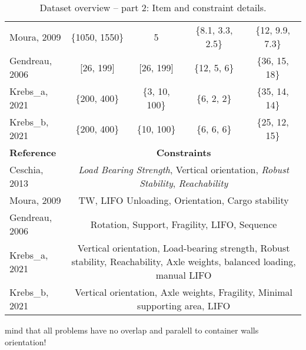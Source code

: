 \begin{table}[!ht]
\begin{tabular}{@{}lcccc@{}}
        Moura, 2009        & \{1050, 1550\}                                                                                                                                               & 5                   & \{8.1, 3.3, 2.5\}      & \{12, 9.9, 7.3\}         \\
        Gendreau, 2006     & [26, 199]                                                                                                                                                    & [26, 199]           & \{12, 5, 6\}           & \{36, 15, 18\}           \\
        Krebs\_a, 2021     & \{200, 400\}                                                                                                                                                 & \{3, 10, 100\}      & \{6, 2, 2\}            & \{35, 14, 14\}           \\
        Krebs\_b, 2021     & \{200, 400\}                                                                                                                                                 & \{10, 100\}         & \{6, 6, 6\}            & \{25, 12, 15\}           \\
        \toprule
        \textbf{Reference} & \multicolumn{4}{p{0.75\textwidth}}{\textbf{Constraints}}                                                                                                                                                                               \\
        \midrule
        Ceschia, 2013      & \multicolumn{4}{p{0.75\textwidth}}{\textit{Load Bearing Strength}, Vertical orientation, \textit{Robust Stability}, \textit{Reachability}}                                                                                             \\
        Moura, 2009        & \multicolumn{4}{p{0.75\textwidth}}{TW, LIFO Unloading, Orientation, Cargo stability  }                                                                                                                                                 \\
        Gendreau, 2006     & \multicolumn{4}{p{0.75\textwidth}}{Rotation, Support, Fragility, LIFO, Sequence}                                                                                                                                                       \\
        Krebs\_a, 2021     & \multicolumn{4}{p{0.75\textwidth}}{Vertical orientation, Load-bearing strength, Robust stability, Reachability, Axle weights, balanced loading, manual LIFO}                                                                           \\
        Krebs\_b, 2021     & \multicolumn{4}{p{0.75\textwidth}}{Vertical orientation, Axle weights, Fragility, Minimal supporting area, LIFO}                                                                                                                       \\
        \bottomrule
    \end{tabular}
    \caption{Dataset overview – part 2: Item and constraint details.}
\end{table}
mind that all problems have no overlap and paralell to container walls orientation!

